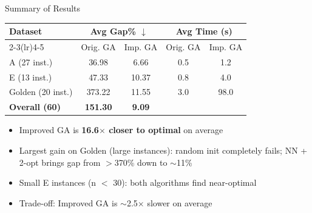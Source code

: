\documentclass{beamer}
\begin{document}
\begin{frame}{Summary of Results}
  \small
  \begin{center}
  \begin{tabular}{lcccc}
    \toprule
    Dataset & \multicolumn{2}{c}{Avg Gap\% $\downarrow$} & \multicolumn{2}{c}{Avg Time (s)} \\
    \cmidrule(lr){2-3}\cmidrule(lr){4-5}
    & Orig. GA & Imp. GA & Orig. GA & Imp. GA \\
    \midrule
    A (27 inst.)      & 36.98  & 6.66   & 0.5  & 1.2  \\
    E (13 inst.)      & 47.33  & 10.37  & 0.8  & 4.0  \\
    Golden (20 inst.) & 373.22 & 11.55  & 3.0  & 98.0 \\
    \midrule
    \textbf{Overall (60)} & \textbf{151.30} & \textbf{9.09} & & \\
    \bottomrule
  \end{tabular}
  \end{center}
  \vspace{4pt}
  \begin{itemize}
    \item Improved GA is \textbf{16.6$\times$ closer to optimal} on average
    \item Largest gain on Golden (large instances): random init completely fails; NN + 2-opt brings gap from $>$370\% down to $\sim$11\%
    \item Small E instances (n $<$ 30): both algorithms find near-optimal
    \item Trade-off: Improved GA is $\sim$2.5$\times$ slower on average
  \end{itemize}
\end{frame}


\end{document}
